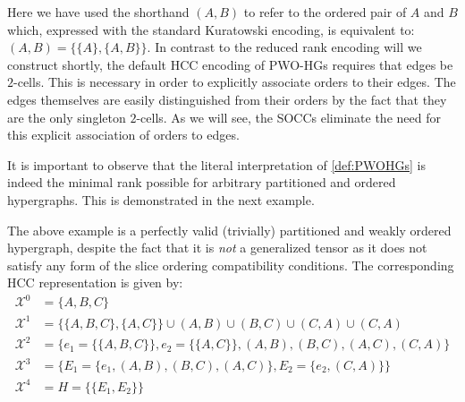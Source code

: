 \documentclass{article}
\theoremstyle{plain}
\theoremstyle{definition}
\theoremstyle{remark}
\newcommand{\cX}{\mathcal{X}}
\begin{document}
Here we have used the shorthand $(A, B)$ to refer to the ordered pair of $A$ and $B$ which, expressed with the standard Kuratowski encoding, is equivalent to: $(A, B) = \big\{ \{A\}, \{A, B\} \big\}$. In contrast to the reduced rank encoding will we construct shortly, the default HCC encoding of PWO-HGs requires that edges be $2$-cells. This is necessary in order to explicitly associate orders to their edges. The edges themselves are easily distinguished from their orders by the fact that they are the only singleton $2$-cells. As we will see, the SOCCs eliminate the need for this explicit association of orders to edges.

It is important to observe that the literal interpretation of \cref{def:PWOHGs} is indeed the minimal rank possible for arbitrary partitioned and ordered hypergraphs. This is demonstrated in the next example.
\begin{center}
\end{center}
The above example is a perfectly valid (trivially) partitioned and weakly ordered hypergraph, despite the fact that it is \textit{not} a generalized tensor as it does not satisfy any form of the slice ordering compatibility conditions. The corresponding HCC representation is given by:
\begin{equation*}
	\begin{aligned}
		\cX^0 &= \{A, B, C\}\\
		\cX^1 &= \big\{ \{A, B, C\}, \{A, C\} \big\} \cup (A, B) \cup (B, C) \cup (C, A) \cup (C, A)\\
		\cX^2 &= \Big\{ e_1 = \big\{ \{A, B, C\} \big\}, e_2 = \big\{ \{A, C\} \big\}, (A, B), (B, C), (A, C), (C, A) \Big\}\\
		\cX^3 &= \Big\{ E_1 = \big\{e_1, (A, B), (B, C), (A, C)\big\}, E_2 = \big\{e_2, (C, A)\big\} \Big\}\\
		\cX^4 &= H = \big\{ \{E_1, E_2\}\big\}\\
	\end{aligned}
\end{equation*}
\end{document}
